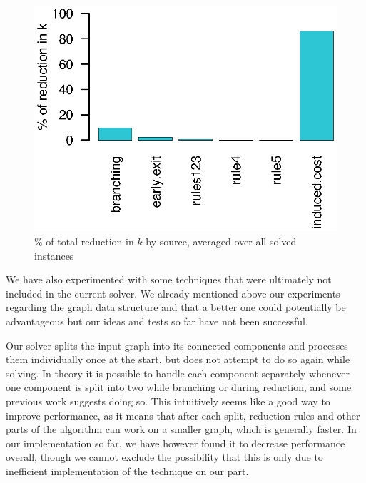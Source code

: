 \documentclass[12pt,oneside,english,parskip=full,headings=small]{scrbook}
\newcommand{\todo}[1]{\paragraph{TODO} #1}
\theoremstyle{definition}
\begin{document}
\begin{figure}[h]
	\centering
	\includegraphics[scale=0.8]{interleaved_effectiveness}
	\caption{\% of total reduction in $k$ by source, averaged over all solved instances}
	\label{fig:interleaved_effectiveness}
\end{figure}



We have also experimented with some techniques that were ultimately not included in the current
solver. We already mentioned above our experiments regarding the graph data structure and that a
better one could potentially be advantageous but our ideas and tests so far have not been
successful.

Our solver splits the input graph into its connected components and processes them individually once
at the start, but does not attempt to do so again while solving. In theory it is possible to handle
each component separately whenever one component is split into two while branching or during
reduction, and some previous work suggests doing so. This intuitively seems like a good way to
improve performance, as it means that after each split, reduction rules and other parts of the
algorithm can work on a smaller graph, which is generally faster. In our implementation so far, we
have however found it to decrease performance overall, though we cannot exclude the possibility that
this is only due to inefficient implementation of the technique on our part.
\end{document}
